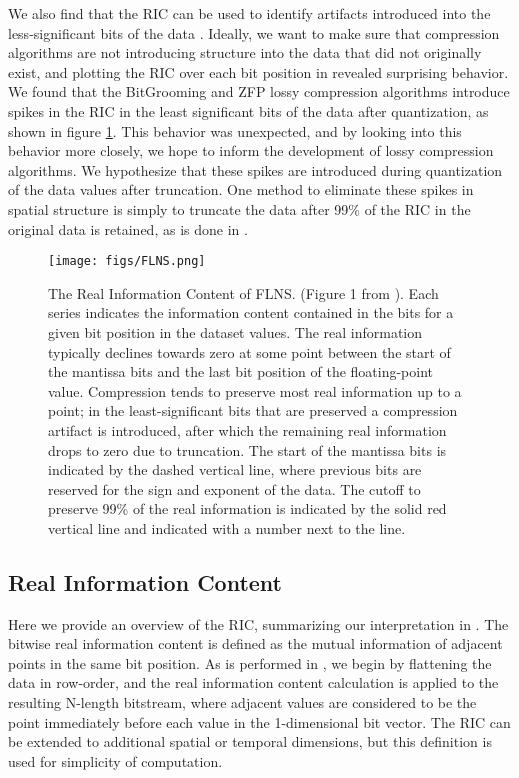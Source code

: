  We also find that the RIC can be used to identify artifacts introduced into the less-significant bits of the data \cite{drbsd_real}. Ideally, we want to make sure that compression algorithms are not introducing structure into the data that did not originally exist, and plotting the RIC over each bit position in \cite{drbsd_real} revealed surprising behavior. We found that the BitGrooming and ZFP lossy compression algorithms introduce spikes in the RIC in the least significant bits of the data after quantization, as shown in figure \ref{FLNS}. This behavior was unexpected, and by looking into this behavior more closely, we hope to inform the development of lossy compression algorithms. We hypothesize that these spikes are introduced during quantization of the data values after truncation. One method to eliminate these spikes in spatial structure is simply to truncate the data after 99\% of the RIC in the original data is retained, as is done in \cite{klower}. 

\begin{figure}[H]
    \centering
    \texttt{[image: figs/FLNS.png]}
    \caption[The Real Information Content of FLNS.]{The Real Information Content of FLNS. (Figure 1 from \cite{drbsd_real}). Each series indicates the information content contained in the bits for a given bit position in the dataset values. The real information typically declines towards zero at some point between the start of the mantissa bits and the last bit position of the floating-point value. Compression tends to preserve most real information up to a point; in the least-significant bits that are preserved a compression artifact is introduced, after which the remaining real information drops to zero due to truncation. The start of the mantissa bits is indicated by the dashed vertical line, where previous bits are reserved for the sign and exponent of the data. The cutoff to preserve 99\% of the real information is indicated by the solid red vertical line and indicated with a number next to the line.}
    \label{FLNS}
\end{figure}
 

\subsection{Real Information Content}

Here we provide an overview of the RIC, summarizing our interpretation in \cite{drbsd_real}. The bitwise real information content is defined as the mutual information of adjacent points in the same bit position. As is performed in \cite{klower}, we begin by flattening the data in row-order, and the real information content calculation is applied to the resulting N-length bitstream, where adjacent values are considered to be the point immediately before each value in the 1-dimensional bit vector. The RIC can be extended to additional spatial or temporal dimensions, but this definition is used for simplicity of computation. 


